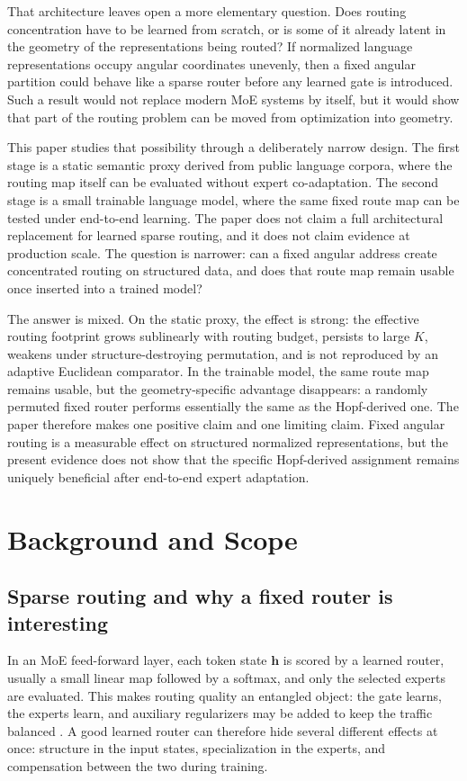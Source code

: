 \documentclass[10pt,letterpaper]{article}
\begin{document}
That architecture leaves open a more elementary question. Does routing concentration have to be learned from scratch, or is some of it already latent in the geometry of the representations being routed? If normalized language representations occupy angular coordinates unevenly, then a fixed angular partition could behave like a sparse router before any learned gate is introduced. Such a result would not replace modern MoE systems by itself, but it would show that part of the routing problem can be moved from optimization into geometry.

This paper studies that possibility through a deliberately narrow design. The first stage is a static semantic proxy derived from public language corpora, where the routing map itself can be evaluated without expert co-adaptation. The second stage is a small trainable language model, where the same fixed route map can be tested under end-to-end learning. The paper does not claim a full architectural replacement for learned sparse routing, and it does not claim evidence at production scale. The question is narrower: can a fixed angular address create concentrated routing on structured data, and does that route map remain usable once inserted into a trained model?

The answer is mixed. On the static proxy, the effect is strong: the effective routing footprint grows sublinearly with routing budget, persists to large $K$, weakens under structure-destroying permutation, and is not reproduced by an adaptive Euclidean comparator. In the trainable model, the same route map remains usable, but the geometry-specific advantage disappears: a randomly permuted fixed router performs essentially the same as the Hopf-derived one. The paper therefore makes one positive claim and one limiting claim. Fixed angular routing is a measurable effect on structured normalized representations, but the present evidence does not show that the specific Hopf-derived assignment remains uniquely beneficial after end-to-end expert adaptation.

\section{Background and Scope}
\subsection{Sparse routing and why a fixed router is interesting}
In an MoE feed-forward layer, each token state $\mathbf{h}$ is scored by a learned router, usually a small linear map followed by a softmax, and only the selected experts are evaluated. This makes routing quality an entangled object: the gate learns, the experts learn, and auxiliary regularizers may be added to keep the traffic balanced \citep{shazeer2017outrageously, fedus2022switch}. A good learned router can therefore hide several different effects at once: structure in the input states, specialization in the experts, and compensation between the two during training.
\end{document}

